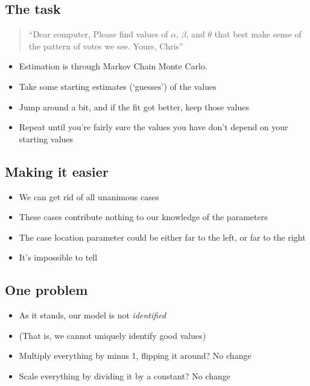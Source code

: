 \documentclass[12pt,twoside]{article}
\providecommand{\tightlist}{%
  \setlength{\itemsep}{0pt}\setlength{\parskip}{0pt}}
\begin{document}
\subsection{The task}\label{the-task}

\begin{quote}
``Dear computer, Please find values of \(\alpha\), \(\beta\), and
\(\theta\) that best make sense of the pattern of votes we see. Yours,
Chris''
\end{quote}

\begin{itemize}
\tightlist
\item
  Estimation is through Markov Chain Monte Carlo.
\item
  Take some starting estimates (`guesses') of the values
\item
  Jump around a bit, and if the fit got better, keep those values
\item
  Repeat until you're fairly sure the values you have don't depend on
  your starting values
\end{itemize}

\subsection{Making it easier}\label{making-it-easier}

\begin{itemize}
\tightlist
\item
  We can get rid of all unanimous cases
\item
  These cases contribute nothing to our knowledge of the parameters
\item
  The case location parameter could be either far to the left, or far to
  the right
\item
  It's impossible to tell
\end{itemize}

\subsection{One problem}\label{one-problem}

\begin{itemize}
\tightlist
\item
  As it stands, our model is not \emph{identified}
\item
  (That is, we cannot uniquely identify good values)
\item
  Multiply everything by minus 1, flipping it around? No change
\item
  Scale everything by dividing it by a constant? No change
\end{itemize}
\end{document}

